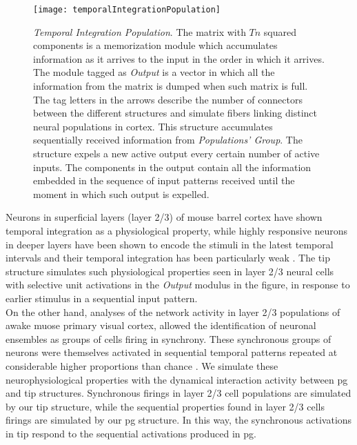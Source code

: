 \documentclass[11pt,a4paper]{article}
\begin{document}
\begin{figure}[h]
\centering
\texttt{[image: temporalIntegrationPopulation]}
\caption{\scriptsize{\textit{Temporal Integration Population}.
The matrix with $Tn$ squared components is a memorization module which accumulates
information as it arrives to the input in the order in which it arrives.
The module tagged as \textit{Output} is a vector in which all the information from the matrix
is dumped when such matrix is full.
The tag letters in the arrows describe the number of connectors between the different structures
and simulate fibers linking distinct neural populations in cortex.
This structure accumulates sequentially received information from \textit{Populations' Group}.
The structure expels a new active output every certain number of active
inputs.
The components in the output contain all the information embedded
in the sequence of input patterns received until the moment in which such
output is expelled.}}
\label{fig:tip}
\end{figure}

Neurons in superficial layers (layer 2/3) of mouse barrel cortex
have shown temporal integration as a physiological property,
while highly responsive neurons in deeper layers have been shown to
encode the stimuli in the latest temporal intervals
and their temporal integration has been particularly weak \cite{pitas16}.
The \ac{tip} structure simulates such physiological properties seen
in layer 2/3 neural cells with selective unit activations in the
\textit{Output} modulus in the figure, in response to earlier stimulus
in a sequential input pattern.\\

On the other hand, analyses of the network activity in layer 2/3 populations of awake
muose primary visual cortex, allowed the identification of neuronal ensembles
as groups of cells firing in synchrony.
These synchronous groups of neurons were themselves activated in sequential temporal patterns
repeated at considerable higher proportions than chance \cite{carrillo15}.
We simulate these neurophysiological properties with the dynamical interaction
activity between \ac{pg} and \ac{tip} structures.
Synchronous firings in layer 2/3 cell populations are simulated by our \ac{tip} structure,
while the sequential properties found in layer 2/3 cells firings are simulated by
our \ac{pg} structure.
In this way, the synchronous activations in \ac{tip} respond to the sequential
activations produced in \ac{pg}.\\
\end{document}
